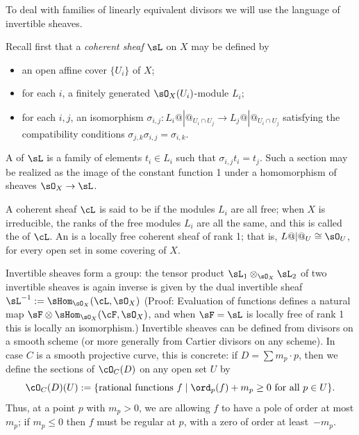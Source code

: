 To deal with families of linearly equivalent divisors we will use the language of invertible sheaves. 
%

Recall first that a \emph{coherent sheaf} $\sL$ on $X$ may be defined by
%
\begin{itemize}
 \item an open affine cover $\{U_{i}\}$ of $X$; 
 \item for each $i$, a finitely generated $\sO_{X}(U_{i})$-module $L_{i}$;
 \item for each $i,j$, an isomorphism $\sigma_{i,j}: L_{i}@|@_{U_{i}\cap U_{j}} \to L_{j}@|@_{U_{i}\cap U_{j}}$
 satisfying the compatibility conditions $\sigma_{j,k}\sigma_{i,j} = \sigma_{i,k}$. 
 \end{itemize}

A 
%
of $\sL$ is a family of elements $t_{i}\in L_{i}$ such that 
$\sigma_{i,j} t_{i} = t_{j}$. Such a section may be realized as the image of the constant function 1 under
a homomorphism of sheaves $\sO_{X} \to \sL$. 

A coherent sheaf $\cL$ is said to be 
%
if the modules $L_i$ are all free; when $X$ is irreducible, the ranks
of the free modules $L_{i}$ are all the same, and this is called the
%
of $\cL$.
An 
%
is a locally free coherent sheaf of rank 1;  that is, $L@|@_U \cong \sO_U$,
for every open set in some covering of $X$. 

Invertible sheaves form a group: the tensor product
$\sL_1\otimes_{\sO_X}\sL_2$ of two invertible sheaves is  again 
inverse is given by the dual invertible sheaf $\sL^{-1} := \sHom_{\sO_X}(\cL,\sO_X)$
(Proof: Evaluation of functions defines a natural map $\sF \otimes  \sHom_{\sO_X}(\cF,\sO_X)$,
and when $\sF = \sL$ is locally free of rank 1 this is locally an isomorphism.) 
Invertible sheaves can be defined from divisors on a smooth scheme (or more generally from Cartier divisors on any scheme). In case $C$ is a smooth projective curve, this is concrete: if $D = \sum m_p \cdot p$, then we define the sections of $\cO_C(D)$ on any open set $U$ by
$$
\cO_C(D)(U) := \{ \text{rational functions } f \mid \ord_p(f) + m_p \geq 0 \text{ for all } p \in U \}.
$$
Thus, at a point $p$ with $m_p > 0$, we are allowing $f$ to have a pole of order at most $m_p$; if $m_p \leq 0$ then $f$ must be regular at $p$, with a zero of order at least~$-m_p$.

